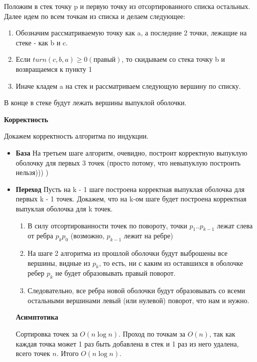 \documentclass[11pt]{article}
\begin{document}
Положим в стек точку p и первую точку из отсортированного списка остальных. Далее идем
по всем точкам из списка и делаем следующее:

\begin{enumerate}
\item Обозначим рассматриваемую точку как a, а последние 2 точки, лежащие на стеке - как b и c.
\item Если \(turn(c, b, a) \geq 0 (правый)\), то скидываем со стека точку b и возвращаемся к пункту 1
\item Иначе кладем a на стек и рассматриваем следующую вершину по списку.
\end{enumerate}

В конце в стеке будут лежать вершины выпуклой оболочки.

\textbf{Корректность}

Докажем корректность алгоритма по индукции.

\begin{itemize}
\item \textbf{База}
На третьем шаге алгоритм, очевидно, построит корректную выпуклую оболочку для первых 3 точек
(просто потому, что невыпуклую построить нельзя))) )
\item \textbf{Переход}
Пусть на k - 1 шаге построена корректная выпуклая оболочка для первых k - 1 точек.
Докажем, что на k-ом шаге будет построена корректная выпуклая оболочка для k точек.
\begin{enumerate}
\item В силу отсортированности точек по повороту, точки \(p_1 .. p_{k-1}\) лежат слева от ребра
\(p_k p_0\) (возможно, \(p_{k-1}\) лежит на ребре)
\item На шаге 2 алгоритма из прошлой оболочки будут выброшены все вершины, видные из \(p_k\),
то есть, ни с каким из оставшихся в оболочке ребер \(p_k\) не будет образовывать правый поворот.
\item Следовательно, все ребра новой оболочки будут образовывать со всеми остальными вершинами левый (или нулевой)
поворот, что нам и нужно.
\end{enumerate}
\textbf{Асимптотика}

Сортировка точек за \(O(n \log n)\). Проход по точкам за \(O(n)\), так как каждая точка может 1 раз быть
добавлена в стек и 1 раз из него удалена, всего точек \(n\). Итого \(O(n \log n)\).
\end{itemize}
\end{document}

